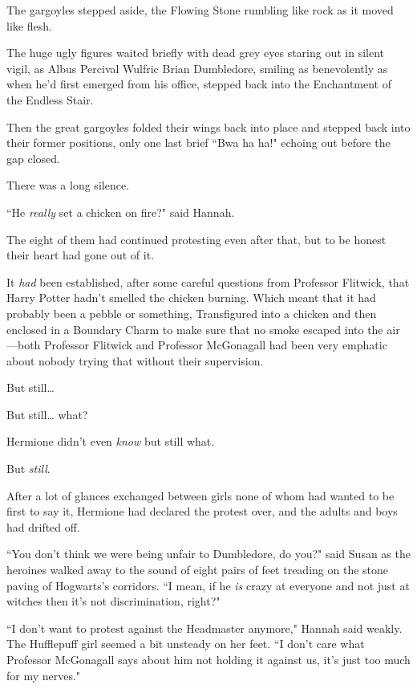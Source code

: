 The gargoyles stepped aside, the Flowing Stone rumbling like rock as it moved like flesh.

The huge ugly figures waited briefly with dead grey eyes staring out in silent vigil, as Albus Percival Wulfric Brian Dumbledore, smiling as benevolently as when he'd first emerged from his office, stepped back into the Enchantment of the Endless Stair.

Then the great gargoyles folded their wings back into place and stepped back into their former positions, only one last brief ``Bwa ha ha!" echoing out before the gap closed.

There was a long silence.

``He \emph{really} set a chicken on fire?" said Hannah.

\later

The eight of them had continued protesting even after that, but to be honest their heart had gone out of it.

It \emph{had} been established, after some careful questions from Professor Flitwick, that Harry Potter hadn't smelled the chicken burning. Which meant that it had probably been a pebble or something, Transfigured into a chicken and then enclosed in a Boundary Charm to make sure that no smoke escaped into the air—both Professor Flitwick and Professor McGonagall had been very emphatic about nobody trying that without their supervision.

But still{\ldots}

But still{\ldots} what?

Hermione didn't even \emph{know} but still what.

But \emph{still}.

After a lot of glances exchanged between girls none of whom had wanted to be first to say it, Hermione had declared the protest over, and the adults and boys had drifted off.

``You don't think we were being unfair to Dumbledore, do you?" said Susan as the heroines walked away to the sound of eight pairs of feet treading on the stone paving of Hogwarts's corridors. ``I mean, if he \emph{is} crazy at everyone and not just at witches then it's not discrimination, right?"

``I don't want to protest against the Headmaster anymore," Hannah said weakly. The Hufflepuff girl seemed a bit unsteady on her feet. ``I don't care what Professor McGonagall says about him not holding it against us, it's just too much for my nerves."

